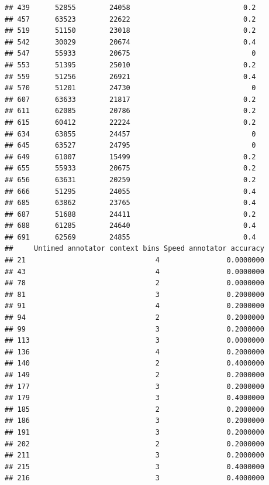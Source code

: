 \documentclass[
]{article}
\begin{document}
\begin{verbatim}
## 439      52855        24058                           0.2
## 457      63523        22622                           0.2
## 519      51150        23018                           0.2
## 542      30029        20674                           0.4
## 547      55933        20675                             0
## 553      51395        25010                           0.2
## 559      51256        26921                           0.4
## 570      51201        24730                             0
## 607      63633        21817                           0.2
## 611      62085        20786                           0.2
## 615      60412        22224                           0.2
## 634      63855        24457                             0
## 645      63527        24795                             0
## 649      61007        15499                           0.2
## 655      55933        20675                           0.2
## 656      63631        20259                           0.2
## 666      51295        24055                           0.4
## 685      63862        23765                           0.4
## 687      51688        24411                           0.2
## 688      61285        24640                           0.4
## 691      62569        24855                           0.4
##     Untimed annotator context bins Speed annotator accuracy
## 21                               4                0.0000000
## 43                               4                0.0000000
## 78                               2                0.0000000
## 81                               3                0.2000000
## 91                               4                0.2000000
## 94                               2                0.2000000
## 99                               3                0.2000000
## 113                              3                0.0000000
## 136                              4                0.2000000
## 140                              2                0.4000000
## 149                              2                0.2000000
## 177                              3                0.2000000
## 179                              3                0.4000000
## 185                              2                0.2000000
## 186                              3                0.2000000
## 191                              3                0.2000000
## 202                              2                0.2000000
## 211                              3                0.2000000
## 215                              3                0.4000000
## 216                              3                0.4000000

\end{verbatim}
\end{document}
